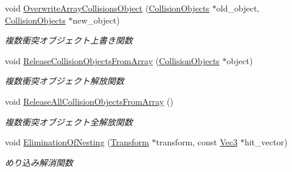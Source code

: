 \begin{DoxyCompactItemize}
void \mbox{\hyperlink{class_collision_base_a4a7bba0fc9d39e27dc58d695f04cf186}{Overwrite\+Array\+Collisions\+Object}} (\mbox{\hyperlink{class_collision_objects}{Collision\+Objects}} $\ast$old\+\_\+object, \mbox{\hyperlink{class_collision_objects}{Collision\+Objects}} $\ast$new\+\_\+object)
\begin{DoxyCompactList}\small\item\em 複数衝突オブジェクト上書き関数 \end{DoxyCompactList}\item 
void \mbox{\hyperlink{class_collision_base_a46bbb58a0dd818fc172f34462b1d5b08}{Release\+Collision\+Objects\+From\+Array}} (\mbox{\hyperlink{class_collision_objects}{Collision\+Objects}} $\ast$object)
\begin{DoxyCompactList}\small\item\em 複数衝突オブジェクト解放関数 \end{DoxyCompactList}\item 
void \mbox{\hyperlink{class_collision_base_a54d52219e2bf43ed2a9b2a11813934ea}{Release\+All\+Collision\+Objects\+From\+Array}} ()
\begin{DoxyCompactList}\small\item\em 複数衝突オブジェクト全解放関数 \end{DoxyCompactList}\item 
void \mbox{\hyperlink{class_collision_base_a257660ba9ad63f8c92137fdd24ad46cb}{Elimination\+Of\+Nesting}} (\mbox{\hyperlink{class_transform}{Transform}} $\ast$transform, const \mbox{\hyperlink{_vector3_d_8h_ab16f59e4393f29a01ec8b9bbbabbe65d}{Vec3}} $\ast$hit\+\_\+vector)
\begin{DoxyCompactList}\small\item\em めり込み解消関数 \end{DoxyCompactList}\end{DoxyCompactItemize}
